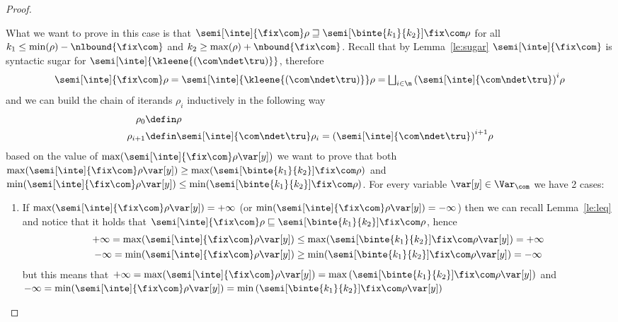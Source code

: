 \begin{proof}
\begin{inductive}
    \case{\(\fix{\com}\)} What we want to prove in this case is that
    \(\semi[\inte]{\fix\com}\rho \sqsupseteq
    \semi[\binte{k_1}{k_2}]{\fix\com}\rho\) for all
    \(k_1 \leq \min(\rho) - \nlbound{\fix\com}\) and
    \(k_2 \geq \max(\rho) + \nbound{\fix\com}\). Recall that by
    Lemma~\ref{le:sugar} \(\semi[\inte]{\fix\com}\) is syntactic sugar
    for \(\semi[\inte]{\kleene{(\com \ndet \tru)}}\), therefore
    \begin{equation}\label{eq:fixtolub}
      \semi[\inte]{\fix\com}\rho =
      \semi[\inte]{\kleene{(\com\ndet\tru)}}\rho =
      \textstyle\bigsqcup_{i\in\n}{\left(\semi[\inte]{\com\ndet\tru}\right)}^i\rho
    \end{equation}
    and we can build the chain of iterands \(\rho_i\) inductively in
    the following way
    \begin{align*}
      \rho_0 & \defin \rho \\
      \rho_{i+1} & \defin \semi[\inte]{\com\ndet\tru}\rho_i = {\left(\semi[\inte]{\com\ndet\tru}\right)}^{i+1}\rho
    \end{align*}
    based on the value of \(\max(\semi[\inte]{\fix\com}\rho\var[y])\)
    we want to prove that both
    \(\max(\semi[\inte]{\fix\com}\rho\var[y]) \geq
    \max(\semi[\binte{k_1}{k_2}]{\fix\com}\rho)\) and
    \(\min(\semi[\inte]{\fix\com}\rho\var[y]) \leq
    \min(\semi[\binte{k_1}{k_2}]{\fix\com}\rho)\). For every variable
    \(\var[y] \in \Var_{\com}\) we have 2 cases:
    \begin{enumerate}[label=(\roman*)]
    \item If \(\max(\semi[\inte]{\fix\com}\rho\var[y]) = + \infty\)
      (or \(\min(\semi[\inte]{\fix\com}\rho\var[y]) = - \infty\)) then
      we can recall Lemma~\ref{le:leq} and notice that it holds that
      \({\semi[\inte]{\fix\com}\rho} \sqsubseteq
      {\semi[\binte{k_1}{k_2}]{\fix\com}\rho}\), hence
      \begin{align*}
        +\infty = \max({\semi[\inte]{\fix\com}\rho\var[y]}) & \leq \max({\semi[\binte{k_1}{k_2}]{\fix\com}\rho\var[y]}) = +\infty \\
        -\infty = \min({\semi[\inte]{\fix\com}\rho\var[y]}) & \geq \min({\semi[\binte{k_1}{k_2}]{\fix\com}\rho\var[y]}) = -\infty
      \end{align*}
      but this means that
      \(+\infty = {\max({\semi[\inte]{\fix\com}\rho\var[y]})} =
      {\max\left({\semi[\binte{k_1}{k_2}]{\fix\com}\rho\var[y]}\right)}\)
      and
      \(-\infty = {\min({\semi[\inte]{\fix\com}\rho\var[y]})} =
      {\min\left({\semi[\binte{k_1}{k_2}]{\fix\com}\rho\var[y]}\right)}\)

\end{enumerate}
\end{inductive}
\end{proof}

